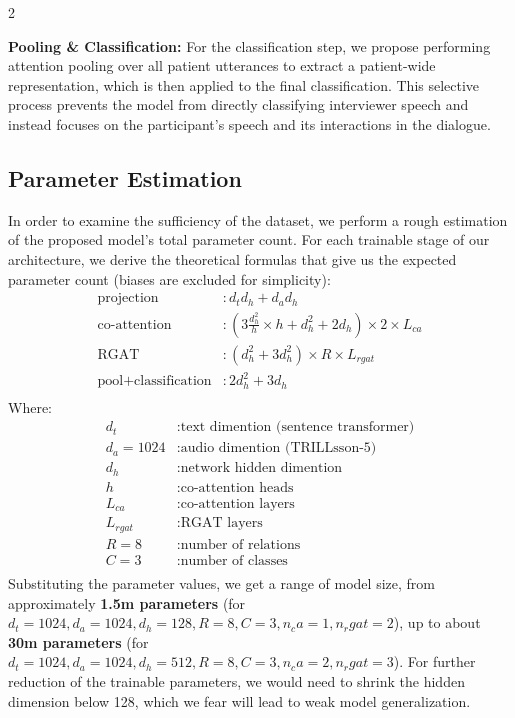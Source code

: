 \documentclass[10pt]{article}
\newcommand{\new}[1]{%
    \begin{tcolorbox}[colback=green!10!white, colframe=green!50!black, title=New]
    #1
    \end{tcolorbox}
}
\newcommand{\tpar}[1]{\par\textbf{#1: }}
\begin{document}
\begin{multicols}{2}
\tpar{Pooling \& Classification} For the classification step, we propose
performing attention pooling over all patient utterances to extract a
patient-wide representation, which is then applied to the final classification.
This selective process prevents the model from directly classifying interviewer
speech and instead focuses on the participant's speech and its interactions in
the dialogue.

\new{\subsection{Parameter Estimation}}
In order to examine the sufficiency of the dataset, we perform a rough
estimation of the proposed model's total parameter count. For each trainable
stage of our architecture, we derive the theoretical formulas that give us the
expected parameter count (biases are excluded for simplicity):
\begin{align*}
	\text{projection}&: d_t  d_h + d_a d_h \\
	\text{co-attention}&: (3\frac{d_h^2}{h}\times h + d_h^2 + 2 d_h)\times2\times L_{ca}\\
	\text{RGAT}&: (d_h^2 + 3d_h^2)\times R \times L_{rgat}\\
	\text{pool+classification}&: 2d_h^2+3d_h\\
\end{align*}
Where:
\begin{align*}
   d_t&: \text{text dimention (sentence transformer)}\\
   d_a=1024&: \text{audio dimention (TRILLsson-5)}\\
   d_h&: \text{network hidden dimention}\\
   h&: \text{co-attention heads}\\
   L_{ca}&: \text{co-attention layers}\\
   L_{rgat}&: \text{RGAT layers}\\
   R=8&: \text{number of relations}\\
   C=3&: \text{number of classes}\\
\end{align*}
Substituting the parameter values, we get a range of model size, from
approximately \textbf{1.5m parameters} (for $d_t=1024, d_a=1024, d_h=128, R=8,
C=3, n_ca=1, n_rgat=2$), up to about \textbf{30m parameters} (for $d_t=1024,
d_a=1024, d_h=512, R=8, C=3, n_ca=2, n_rgat=3$). For further reduction of the
trainable parameters, we would need to shrink the hidden dimension below 128,
which we fear will lead to weak model generalization.



\end{multicols}
\end{document}

